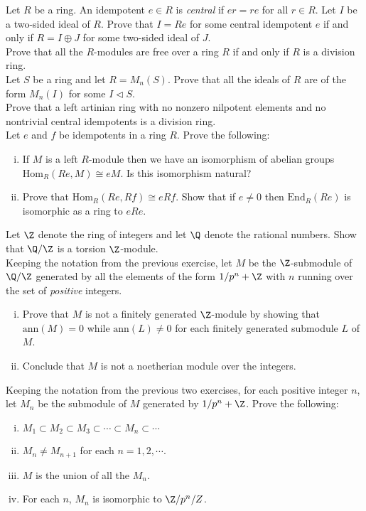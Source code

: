 \prob Let $R$ be a ring. An idempotent $e \in R$ is \emph{central} if $er=re$ for all $r \in R$. Let $I$ be a two-sided ideal of $R$. Prove that $I=Re$ for some central idempotent $e$ if and only if $R=I \oplus J$ for some two-sided ideal of $J$. \\


\prob Prove that all the $R$-modules are free over a ring $R$ if and only if $R$ is a division ring. \\


\prob Let $S$ be a ring and let $R=M_n(S)$. Prove that all the ideals of $R$ are of the form $M_n(I)$ for some $I \lhd S$. \\


\prob Prove that a left artinian ring with no nonzero nilpotent elements and no nontrivial central idempotents is a division ring. \\


\prob Let $e$ and $f$ be idempotents in a ring $R$. Prove the following:
	\begin{enumerate}[(i)]
	\item If $M$ is a left $R$-module then we have an isomorphism of abelian groups $\text{Hom}_R(Re,M) \cong eM$. Is this isomorphism natural?
	\item Prove that $\text{Hom}_R(Re,Rf) \cong eRf$. Show that if $e \neq 0$ then $\text{End}_R(Re)$ is isomorphic as a ring to $eRe$. \\
	\end{enumerate}


\prob Let $\Z$ denote the ring of integers and let $\Q$ denote the rational numbers. Show that $\Q/\Z$ is a torsion $\Z$-module. \\


\prob Keeping the notation from the previous exercise, let $M$ be the $\Z$-submodule of $\Q/\Z$ generated by all the elements of the form $1/p^n+\Z$ with $n$ running over the set of \emph{positive} integers. 
	\begin{enumerate}[(i)]
	\item Prove that $M$ is not a finitely generated $\Z$-module by showing that $\text{ann}(M)=0$ while $\text{ann}(L) \neq 0$ for each finitely generated submodule $L$ of $M$. 
	\item Conclude that $M$ is not a noetherian module over the integers. \\
	\end{enumerate}


\prob Keeping the notation from the previous two exercises, for each positive integer $n$, let $M_n$ be the submodule of $M$ generated by $1/p^n + \Z$. Prove the following:
	\begin{enumerate}[(i)]
	\item $M_1 \subset M_2 \subset M_3 \subset \cdots \subset M_n \subset \cdots$
	\item $M_n \neq M_{n+1}$ for each $n=1,2,\cdots$.
	\item $M$ is the union of all the $M_n$.
	\item For each $n$, $M_n$ is isomorphic to $\Z/p^n/Z$. \\
	\end{enumerate}


